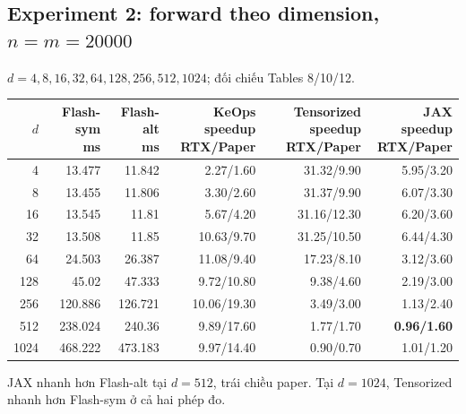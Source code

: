 \documentclass[11pt,a4paper]{article}
\begin{document}
\subsection{Experiment 2: forward theo dimension, $n=m=20000$}
$d=4,8,16,32,64,128,256,512,1024$; đối chiếu Tables 8/10/12.
\begin{center}\footnotesize
\setlength{\tabcolsep}{5pt}
\begin{tabular}{@{}rrrrrr@{}}
\toprule
$d$ & \shortstack{Flash-sym\\ms} & \shortstack{Flash-alt\\ms} & \shortstack{KeOps speedup\\RTX/Paper} & \shortstack{Tensorized speedup\\RTX/Paper} & \shortstack{JAX speedup\\RTX/Paper} \\
\midrule
4 & 13.477 & 11.842 & 2.27/1.60 & 31.32/9.90 & 5.95/3.20 \\
8 & 13.455 & 11.806 & 3.30/2.60 & 31.37/9.90 & 6.07/3.30 \\
16 & 13.545 & 11.81 & 5.67/4.20 & 31.16/12.30 & 6.20/3.60 \\
32 & 13.508 & 11.85 & 10.63/9.70 & 31.25/10.50 & 6.44/4.30 \\
64 & 24.503 & 26.387 & 11.08/9.40 & 17.23/8.10 & 3.12/3.60 \\
128 & 45.02 & 47.333 & 9.72/10.80 & 9.38/4.60 & 2.19/3.00 \\
256 & 120.886 & 126.721 & 10.06/19.30 & 3.49/3.00 & 1.13/2.40 \\
512 & 238.024 & 240.36 & 9.89/17.60 & 1.77/1.70 & \textbf{0.96/1.60} \\
1024 & 468.222 & 473.183 & 9.97/14.40 & 0.90/0.70 & 1.01/1.20 \\
\bottomrule
\end{tabular}
\end{center}
JAX nhanh hơn Flash-alt tại $d=512$, trái chiều paper. Tại $d=1024$,
Tensorized nhanh hơn Flash-sym ở cả hai phép đo.
\end{document}
